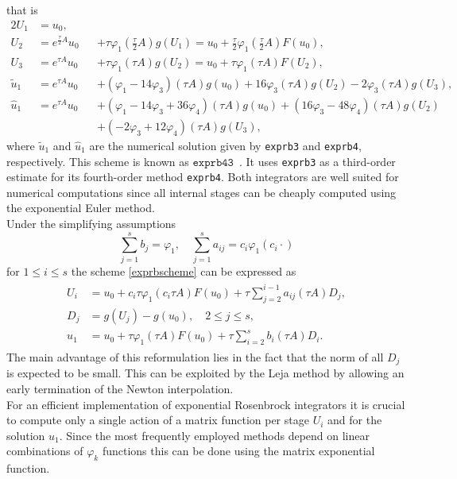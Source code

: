 \documentclass{scrartcl}
\begin{document}
	\noindent that is 
	\begin{alignat*}{2}
	U_{1} &= u_0,\\
	U_{2} &= e^{\frac{\tau}{2} A}u_0 &&+ \tau\varphi_1\left(\frac{\tau}{2} A\right)g(U_1) = u_0 + \frac{\tau}{2}\varphi_1\left(\frac{\tau}{2}A\right)F(u_0),\\
	U_{3} &= e^{\tau A}u_0 &&+ \tau\varphi_1(\tau A)g(U_2) = u_0 + \tau\varphi_1\left(\tau A\right)F(U_2),\\
	\tilde{u}_1 &= e^{\tau A}u_0 &&+ (\varphi_1 - 14\varphi_3)(\tau A)g(u_0) + 16\varphi_3(\tau A)g(U_2) - 2\varphi_3(\tau A)g(U_3),\\
	\hat{u}_1 &= e^{\tau A}u_0 &&+ (\varphi_1 - 14\varphi_3 + 36\varphi_4)(\tau A)g(u_0) + (16\varphi_3 -48\varphi_4)(\tau A)g(U_2) \\
	& &&+ (-2\varphi_3 + 12\varphi_4)(\tau A)g(U_3),
	\end{alignat*}
	where $\tilde{u}_1$ and $\hat{u}_1$ are the numerical solution given by \texttt{exprb3} and \texttt{exprb4}, respectively.
	\noindent This scheme is known as $\texttt{exprb43}$~\cite[Example 2.24]{bible}. It uses \texttt{exprb3} as a third-order estimate for its fourth-order method \texttt{exprb4}. Both integrators are well suited for numerical computations since all internal stages can be cheaply computed using the exponential Euler method. \\
	Under the simplifying assumptions
	\[
	\sum_{j=1}^s b_j = \varphi_1, \quad  \sum_{j=1}^s a_{ij} = c_i\varphi_1(c_i\cdot) 
	\]
	for $1\le i\le s$ the scheme \eqref{exprbscheme} can be expressed as 
	\begin{align}
	\begin{split}
	U_i &= u_0 + c_i\tau\varphi_1(c_i \tau A)F(u_0) + \tau\sum_{j=2}^{i-1}a_{ij}(\tau A)D_j, \\
	D_j &= g(U_j) - g(u_0), \quad 2\le j\le s, \\
	u_1 &= u_0 +    \tau\varphi_1(    \tau A)F(u_0) + \tau\sum_{i=2}^{s}     b_i(\tau A)D_i.
	\end{split}\label{eq:Djscheme}
	\end{align}
	The main advantage of this reformulation lies in the fact that the norm of all $D_j$ is expected to be small. This can be exploited by the Leja method by allowing an early termination of the Newton interpolation. \\
	For an efficient implementation of exponential Rosenbrock integrators it is crucial to compute only a single action of a matrix function per stage $U_i$ and for the solution $u_1$. Since the most frequently employed methods depend on linear combinations of $\varphi_k$ functions this can be done using the matrix exponential function.
	
\end{document}
